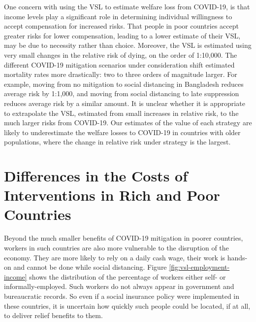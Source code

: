 \documentclass[11pt]{article}
\begin{document}
One concern with using the VSL to estimate welfare loss from COVID-19, is that income levels play a significant role in determining individual willingness to accept compensation for increased risks. That people in poor countries accept greater risks for lower compensation, leading to a lower estimate of their VSL, may be due to necessity rather than choice. Moreover, the VSL is estimated using very small changes in the relative risk of dying, on the order of 1:10,000. The different COVID-19 mitigation scenarios under consideration shift estimated mortality rates more drastically: two to three orders of magnitude larger. For example, moving from no mitigation to social distancing in Bangladesh reduces average risk by 1:1,000, and moving from social distancing to late suppression reduces average risk by a similar amount. It is unclear whether it is appropriate to extrapolate the  VSL, estimated from small increases in relative risk, to the much larger risks from COVID-19. Our estimates of the value of each strategy are likely to underestimate the welfare losses to COVID-19 in countries with older populations, where the change in relative risk under strategy is the largest.

\section{Differences in the Costs of Interventions in Rich and Poor Countries}

Beyond the much smaller benefits of COVID-19 mitigation in poorer countries, workers in such countries are also more vulnerable to the disruption of the economy. They are more likely to rely on a daily cash wage, their work is hands-on and cannot be done while social distancing. Figure \ref{fig:vsl-employment-income} shows the distribution of the percentage of workers either self- or informally-employed. Such workers do not always appear in government and bureaucratic records. So even if a social insurance policy were implemented in these countries, it is uncertain how quickly such people could be located, if at all, to deliver relief benefits to them.
\end{document}
